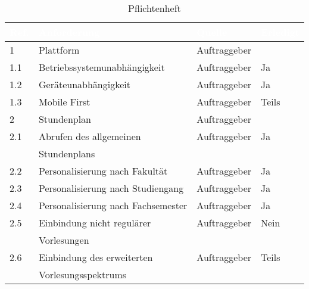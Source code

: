 \begin{table}[H]
\begin{center}
  \begin{tabular}{| l | l | l | l |}

\hline
\rowcolor{Gray}
\textcolor{white}{\textbf{Ref.}} & \textcolor{white}{\textbf{Anforderung}} & \textcolor{white}{\textbf{Quelle}} & \textcolor{white}{\textbf{Erledigt}} \\

\hline
\rowcolor{LGray}
1		& Plattform						& Auftraggeber &\\
\hline
1.1		& Betriebssystemunabhängigkeit 	& Auftraggeber & Ja\\
\hline
1.2	 	& Geräteunabhängigkeit			& Auftraggeber & Ja\\
\hline
1.3		& Mobile First					& Auftraggeber & Teils\\
\hline

\hline    
\rowcolor{LGray} 						
2		& Stundenplan 										& Auftraggeber &\\
\hline
2.1		& Abrufen des allgemeinen 							& Auftraggeber & Ja\\
		& Stundenplans										&			   &\\
\hline
2.2		& Personalisierung nach Fakultät					& Auftraggeber & Ja\\
\hline
2.3		& Personalisierung nach Studiengang					& Auftraggeber & Ja\\
\hline
2.4		& Personalisierung nach Fachsemester 				& Auftraggeber & Ja\\
\hline
2.5		& Einbindung nicht regulärer 						& Auftraggeber & Nein\\
		& Vorlesungen										&			   &\\
\hline
2.6		& Einbindung des erweiterten 						& Auftraggeber & Teils\\
		& Vorlesungsspektrums								&			   &\\
\hline

\end{tabular}
  \end{center}
\caption[Pflichtenheft]{Pflichtenheft}
\label{tab:lastenheft}
\end{table}

